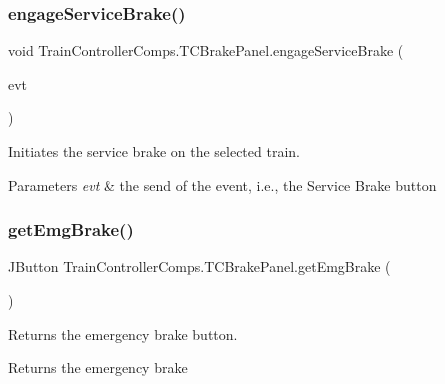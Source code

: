 \subsubsection{\texorpdfstring{engage\+Service\+Brake()}{engageServiceBrake()}}
{\footnotesize\ttfamily void Train\+Controller\+Comps.\+T\+C\+Brake\+Panel.\+engage\+Service\+Brake (\begin{DoxyParamCaption}\item[{java.\+awt.\+event.\+Action\+Event}]{evt }\end{DoxyParamCaption})\hspace{0.3cm}{\ttfamily [private]}}



Initiates the service brake on the selected train. 


\begin{DoxyParams}{Parameters}
{\em evt} & the send of the event, i.\+e., the \textquotesingle{}Service Brake\textquotesingle{} button \\
\hline
\end{DoxyParams}
\mbox{\label{classTrainControllerComps_1_1TCBrakePanel_a1e16cb37e8eecb4d6fc13fbb6f9aa09d}} 
\subsubsection{\texorpdfstring{get\+Emg\+Brake()}{getEmgBrake()}}
{\footnotesize\ttfamily J\+Button Train\+Controller\+Comps.\+T\+C\+Brake\+Panel.\+get\+Emg\+Brake (\begin{DoxyParamCaption}{ }\end{DoxyParamCaption})}



Returns the emergency brake button. 

\begin{DoxyReturn}{Returns}
the emergency brake 
\end{DoxyReturn}
\mbox{\label{classTrainControllerComps_1_1TCBrakePanel_af33870de15eae5f27e4cfce85efda275}} 
